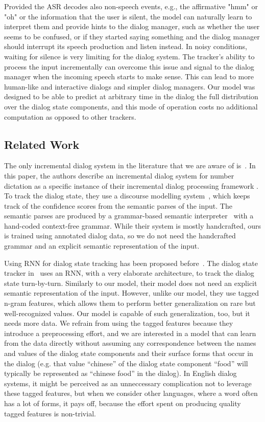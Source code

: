\documentclass[runningheads,a4paper]{llncs}
\begin{document}
Provided the ASR decodes also non-speech events, e.g., the affirmative "hmm" or "oh" or the information that the user is silent, the model can naturally learn to interpret them and provide hints to the dialog manager, such as whether the user seems to be confused, or if they started saying something and the dialog manager should interrupt its speech production and listen instead. In noisy conditions, waiting for silence is very limiting for the dialog system. The tracker's ability to process the input incrementally can overcome this issue and signal to the dialog manager when the incoming speech starts to make sense. This can lead to more human-like and interactive dialogs and simpler dialog managers. Our model was designed to be able to predict at arbitrary time in the dialog the full distribution over the dialog state components, and this mode of operation costs no additional computation as opposed to other trackers.

\subsection{Related Work}
\label{sec:related}

The only incremental dialog system in the literature that we are aware of is~\cite{skantze2009incremental}. In this paper, the authors describe an incremental dialog system for number dictation as a specific instance of their incremental dialog processing framework \cite{schlangen2009general}. To track the dialog state, they use a discourse modelling system~\cite{skantze2008galatea}, which keeps track of the confidence scores from the semantic parses of the input. The semantic parses are produced by a grammar-based semantic interpreter~\cite{skantze2004robust} with a hand-coded context-free grammar. While their system is mostly handcrafted, ours is trained using annotated dialog data, so we do not need the handcrafted grammar and an explicit semantic representation of the input.

Using RNN for dialog state tracking has been proposed before~\cite{henderson2014word,henderson2013deep}. The dialog state tracker in~\cite{henderson2014word} uses an RNN, with a very elaborate architecture, to track the dialog state turn-by-turn. Similarly to our model, their model does not need an explicit semantic representation of the input. However, unlike our model, they use tagged n-gram features, which allows them to perform better generalization on rare but well-recognized values. Our model is capable of such generalization, too, but it needs more data. We refrain from using the tagged features because they introduce a preprocessing effort, and we are interested in a model that can learn from the data directly without assuming any correspondence between the names and values of the dialog state components and their surface forms that occur in the dialog (e.g. that value ``chinese'' of the dialog state component ``food'' will typically be represented as ``chinese food'' in the dialog). In English dialog systems, it might be perceived as an unneccessary complication not to leverage these tagged features, but when we consider other languages, where a word often has a lot of forms, it pays off, because the effort spent on producing quality tagged features is non-trivial.
\end{document}
